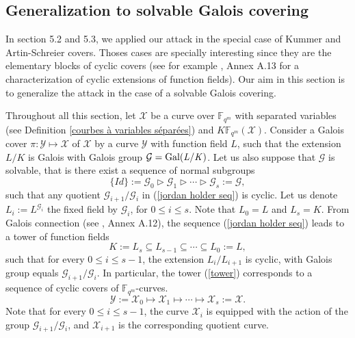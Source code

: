 \documentclass[10pt]{article}
\newcommand{\s}{\vspace{0.3cm}}
\newcommand{\fqm}{\mathbb{F}_{q^m}}
\newcommand{\su}{\subseteq}
\newcommand{\X}{\mathcal{X}}
\newcommand{\Y}{\mathcal{Y}}
\newcommand{\G}{\mathcal{G}}
\begin{document}
\s

\subsection{Generalization to solvable Galois covering}

\s

In section 5.2 and 5.3, we applied our attack in the special case of Kummer and Artin-Schreier covers. Thoses cases are specially interesting since they are the elementary blocks of cyclic covers (see for example \cite{Sti}, Annex A.13 for a characterization of cyclic extensions of function fields). Our aim in this section is to generalize the attack in the case of a solvable Galois covering.

Throughout all this section, let $\X$ be a curve over $\fqm$ with separated variables (see Definition \ref{courbes à variables séparées}) and $K\fqm(\X)$. Consider a Galois cover $\pi : \Y \longmapsto \X$ of $\X$ by a curve $\Y$ with function field $L$, such that the extension $L/K$ is Galois with Galois group $\G = \rm Gal \it (L/K)$. Let us also suppose that $\G$ is solvable, that is there exist a sequence of normal subgroups 
\begin{equation} \label{jordan holder seq}
 \{Id\} := \G_0 \triangleright \G_1 \triangleright \cdots \triangleright \G_s := \G, 
\end{equation} 
such that any quotient $\G_{i+1}/\G_i$ in (\ref{jordan holder seq}) is cyclic. Let us denote $L_i := L^{\G_i}$ the fixed field by $\G_i$, for $0 \leq i \leq s$. Note that $L_0=L$ and $L_s=K$. From Galois connection (see \cite{Sti}, Annex A.12), the sequence (\ref{jordan holder seq}) leads to a tower of function fields
\begin{equation} \label{tower}
K := L_s \su L_{s-1} \su \cdots \su L_0 := L,
\end{equation}
such that for every $0\leq i\leq s-1$, the extension $L_i/L_{i+1}$ is cyclic, with Galois group equals $\G_{i+1}/\G_i$. In particular, the tower (\ref{tower}) corresponds to a sequence of cyclic covers of $\fqm$-curves.
\begin{equation} \label{curve tower}
\Y := \X_0 \longmapsto \X_1 \longmapsto \cdots \longmapsto \X_s := \X.
\end{equation}
Note that for every $0 \leq i \leq s-1$, the curve $\X_i$ is equipped with the action of the group $\G_{i+1}/\G_i$, and $\X_{i+1}$ is the corresponding quotient curve. 
\end{document}
